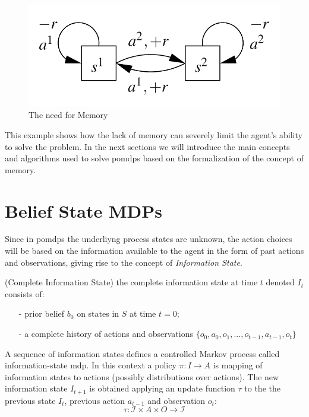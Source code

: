 \begin{figure}[H]
    \centering
    \includegraphics[scale=.2]{images/memorypomdp.png}
    \caption{The need for Memory}
    \label{fig:memory}
\end{figure}

This example shows how the lack of memory can severely limit the agent's ability to solve the problem.
In the next sections we will introduce the main concepts and algorithms used to solve \gls{pomdp}s based on 
the formalization of the concept of memory.

\section{Belief State MDPs}
Since in \glspl{pomdp} the underliyng process states are unknown, the action choices will be based on the information available 
to the agent in the form of past actions and observations, giving rise to the concept of \textit{Information State}.

\begin{definition}
    (Complete Information State) the complete information state at time $t$ denoted
    $I_t$ consists of:
    \begin{itemize}
        \item[-] prior belief $b_0$ on states in $S$ at time $t=0$;
        \item[-] a complete history of actions and observations $\{o_0,a_0,o_1, ..., o_{t-1},a_{t-1},o_t\}$
    \end{itemize}
\end{definition}

A sequence of information states defines a controlled Markov process called 
information-state \gls{mdp}. In this context a policy $\pi: I \rightarrow A$ is mapping of 
information states to actions (possibly distributions over actions).
The new information state $I_{t+1}$ is obtained applying an update function $\tau$ to the
the previous state $I_t$, previous action $a_{t-1}$  and  observation $o_t$:
$$\tau: \mathcal{I} \times A \times O \rightarrow \mathcal{I}$$

